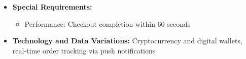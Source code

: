\begin{itemize}
\begin{itemize}
        \item 5a. Payment fails or insufficient funds: System retries and notifies user
        \item 6a. Seller cancels: System processes automatic refund
    \end{itemize}
    \item \textbf{Special Requirements:}
    \begin{itemize}
        \item Performance: Checkout completion within 60 seconds
    \end{itemize}
    \item \textbf{Technology and Data Variations:} Cryptocurrency and digital wallets, real-time order tracking via push notifications
\end{itemize}

